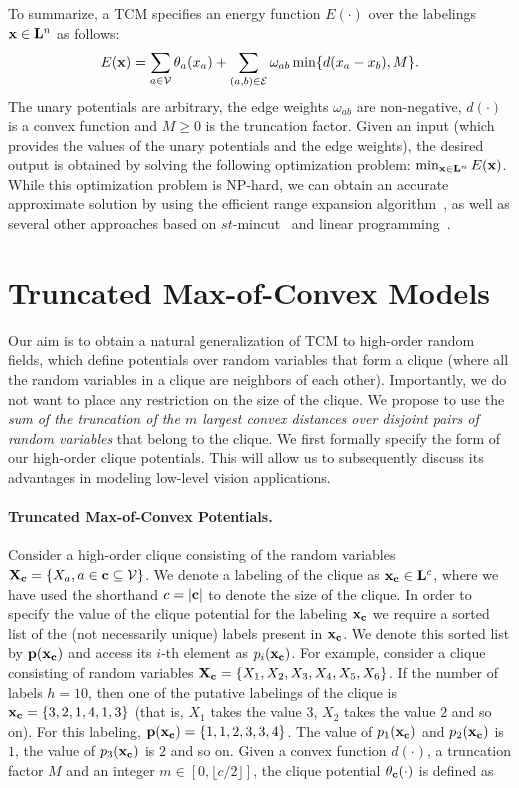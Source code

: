 \documentclass[runningheads]{llncs}
\newcommand{\floor}[1]{\lfloor #1 \rfloor}
\newcommand{\mysection}[1]{\vspace{-2mm}\section{#1}\vspace{-2mm}}
\newcommand{\myparagraph}[1]{\vspace{-2mm}\paragraph{#1}}
\begin{document}
To summarize, a TCM specifies an energy function $E(\cdot)$ over the labelings ${\bf x} \in {\bf L}^n$ as follows:
\begin{equation}
\small E({\bf x}) = \sum_{a \in {\cal V}} \theta_a(x_a) + \sum_{(a,b) \in {\cal E}} \omega_{ab}\min\{d(x_a-x_b),M\}.
\end{equation}
The unary potentials are arbitrary, the edge weights $\omega_{ab}$ are non-negative, $d(\cdot)$ is a convex function and
$M \geq 0$ is the truncation factor.
Given an input (which provides the values of the unary potentials and the edge weights), the desired output is obtained by solving the following
optimization problem: $\min_{{\bf x} \in {\bf L}^n} E({\bf x})$. While this optimization problem is NP-hard, we can obtain an accurate approximate
solution by using the efficient range expansion algorithm~\cite{kumarnips08}, as well as several
other approaches based on $st$-{\sc mincut}~\cite{boykovpami01,guptastoc00,komodakiscvpr07,vekslercvpr07}
and linear programming~\cite{chekurisoda01,kolmogorovpami06,komodakisiccv07}.

\mysection{Truncated Max-of-Convex Models}
\label{sec:TMCM}

Our aim is to obtain a natural generalization of TCM to high-order random fields, which define potentials over random variables that
form a clique (where all the random variables in a clique are neighbors of each other). Importantly, we do not want to place any
restriction on the size of the clique. We propose
to use the {\em sum of the truncation of the $m$ largest convex distances over disjoint pairs of random variables} that belong to the clique. We first formally specify the
form of our high-order clique potentials. This will allow us to subsequently discuss its advantages in modeling low-level vision applications.

\myparagraph{\bf Truncated Max-of-Convex Potentials.} Consider a high-order clique consisting of the random variables ${\bf X}_{\bf c} = \{X_a, a \in {\bf c} \subseteq {\cal V}\}$.
We denote a labeling of the clique as ${\bf x}_{\bf c} \in {\bf L}^{c}$, where we have used the shorthand $c = |{\bf c}|$ to denote the size of the clique.
In order to specify the value of the clique potential for the labeling ${\bf x}_{\bf c}$ we
require a sorted list of the (not necessarily unique) labels present in ${\bf x}_{\bf c}$. We denote this sorted list by ${\bf p}({\bf x}_{\bf c})$
and access its $i$-th element as $p_i({\bf x}_{\bf c})$. For example, consider a clique consisting of random variables ${\bf X}_{\bf c} = \{X_1,X_2,X_3,X_4,X_5,X_6\}$.
If the number of labels $h = 10$, then one of the putative labelings of the clique is ${\bf x}_{\bf c} = \{3,2,1,4,1,3\}$ (that is, $X_1$ takes the value $3$,
$X_2$ takes the value $2$ and so on). For this labeling, ${\bf p}({\bf x}_{\bf c}) = \{1,1,2,3,3,4\}$. The value of $p_1({\bf x}_{\bf c})$ and
$p_2({\bf x}_{\bf c})$ is $1$, the value of $p_3({\bf x}_{\bf c})$ is $2$ and so on. Given a convex function $d(\cdot)$, a truncation factor $M$ and an integer
$m \in [0,\floor{c/2}]$, the clique potential $\theta_{\bf c}(\cdot)$ is defined as
\end{document}
